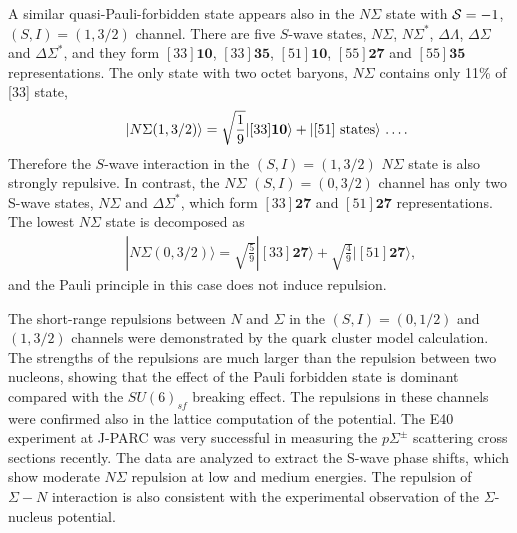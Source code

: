 \documentclass[aps,prd,showpacs,floatfix,reprint,nofootinbib]{revtex4-1}
\newcommand \cc[1]{{\bm {#1}}}
\begin{document}
A similar quasi-Pauli-forbidden state appears also in the $N\Sigma$ state with ${\cal S}=-1$, $(S,I)=(1, 3/2)$ channel.
There are five $S$-wave states, $N\Sigma$, $N\Sigma^*$, $\Delta\Lambda$, $\Delta\Sigma$ and $\Delta\Sigma^*$, and
they form $[33]\cc{10}$, $[33]\cc{35}$, $[51]\cc{10}$, $[55]\cc{27}$ and $[55]\cc{35}$ representations.
The only state with two octet baryons, $N\Sigma$ contains only 11\% of [33] state,
\begin{eqnarray}
&& |N\Sigma (1,3/2)\rangle = \sqrt{\frac{1}{9}} |[33] \cc{10}\rangle  + \hbox{$|[51]$ states$\rangle$ \ldots}.
\end{eqnarray}
Therefore the $S$-wave interaction in the $(S,I)=(1,3/2)$ $N\Sigma$ state is also strongly repulsive.
In contrast, the $N\Sigma$ $(S,I)=(0,3/2)$ channel has only two S-wave states, $N\Sigma$ and $\Delta\Sigma^*$,
which form $[33]\cc{27}$ and $[51]\cc{27}$ representations. The lowest $N\Sigma$ state is decomposed as
\begin{eqnarray}
&& |N\Sigma(0,3/2)\rangle = \sqrt{\frac{5}{9}} |[33] \cc{27}\rangle  + \sqrt{\frac{4}{9}} |[51] \cc{27}\rangle,
\end{eqnarray}
and the Pauli principle in this case does not induce repulsion.

The short-range repulsions between $N$ and $\Sigma$ in the $(S, I)=(0, 1/2)$ and $(1,3/2)$ channels were
demonstrated by the quark
cluster model calculation\cite{Oka:1986fr}.
The strengths of the repulsions are much larger than the repulsion between two nucleons,
showing that the effect  of the Pauli forbidden state is dominant compared with the $SU(6)_{sf}$ breaking effect.
The repulsions in these channels were confirmed also in the lattice computation of the potential\cite{Inoue:2018axd,Nemura:2018tay}.
The E40 experiment at J-PARC was very successful in measuring the $p\Sigma^{\pm}$ scattering cross sections recently\cite{YNexp,J-PARCE40:2022nvq}.
The data are analyzed to extract the S-wave phase shifts, which show moderate $N\Sigma$ repulsion at low and medium energies.
The repulsion of $\Sigma-N$ interaction is also consistent with the experimental observation of the $\Sigma$-nucleus potential\cite{Sigma-Nucleus,Inoue:2018axd}.

\end{document}
